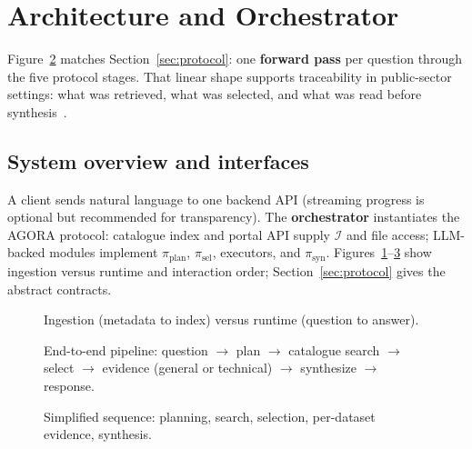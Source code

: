 \documentclass[sigconf,anonymous]{acmart}
\begin{document}
\section{Architecture and Orchestrator}
\label{sec:architecture}

Figure~\ref{fig:pipeline} matches Section~\ref{sec:protocol}: one \textbf{forward pass} per question through the five protocol stages. That linear shape supports traceability in public-sector settings: what was retrieved, what was selected, and what was read before synthesis~\cite{li2024multiagent}.

\subsection{System overview and interfaces}
\label{sec:system-overview}

A client sends natural language to one backend API (streaming progress is optional but recommended for transparency). The \textbf{orchestrator} instantiates the AGORA protocol: catalogue index and portal API supply $\mathcal{I}$ and file access; LLM-backed modules implement $\pi_{\mathrm{plan}}$, $\pi_{\mathrm{sel}}$, executors, and $\pi_{\mathrm{syn}}$. Figures~\ref{fig:highlevel}--\ref{fig:sequence} show ingestion versus runtime and interaction order; Section~\ref{sec:protocol} gives the abstract contracts.

\begin{figure}[t]
  \centering
  \resizebox{0.95\columnwidth}{!}{}
  \caption{Ingestion (metadata to index) versus runtime (question to answer).}
  \label{fig:highlevel}
\end{figure}

\begin{figure}[t]
  \centering
  \resizebox{0.92\columnwidth}{!}{}
  \caption{End-to-end pipeline: question $\rightarrow$ plan $\rightarrow$ catalogue search $\rightarrow$ select $\rightarrow$ evidence (general or technical) $\rightarrow$ synthesize $\rightarrow$ response.}
  \label{fig:pipeline}
\end{figure}

\begin{figure}[t]
  \centering
  \caption{Simplified sequence: planning, search, selection, per-dataset evidence, synthesis.}
  \label{fig:sequence}
\end{figure}
\end{document}
